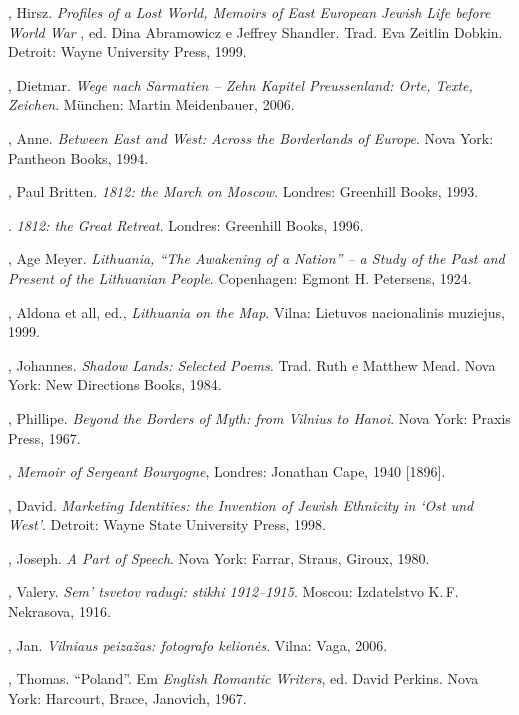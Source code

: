 \begin{bibliohedra}
 , Hirsz. \textit{Profiles of a Lost World, Memoirs of East
  European Jewish Life before World War }, ed. Dina Abramowicz e
  Jeffrey Shandler. Trad. Eva Zeitlin Dobkin. Detroit: Wayne University
  Press, 1999.

  , Dietmar. \textit{Wege nach Sarmatien -- Zehn Kapitel
  Preussenland: Orte, Texte, Zeichen}. München: Martin Meidenbauer,
  2006.

  , Anne. \textit{Between East and West: Across the Borderlands
  of Europe}. Nova York: Pantheon Books, 1994.

  , Paul Britten. \textit{1812: the March on Moscow}. Londres:
  Greenhill Books, 1993.

  \titidem. \textit{1812: the Great Retreat}. Londres:
  Greenhill Books, 1996.

  , Age Meyer. \textit{Lithuania, ``The Awakening of a Nation''
  -- a Study of the Past and Present of the Lithuanian People}.
  Copenhagen: Egmont H. Petersens, 1924.

  , Aldona et all, ed., \textit{Lithuania on the Map}. Vilna:
  Lietuvos nacionalinis muziejus, 1999.

  , Johannes. \textit{Shadow Lands: Selected Poems.} Trad. Ruth e
  Matthew Mead. Nova York: New Directions Books, 1984.

  , Phillipe. \textit{Beyond the Borders of Myth: from Vilnius to
  Hanoi}. Nova York: Praxis Press, 1967.

  , \textit{Memoir of Sergeant Bourgogne}, Londres: Jonathan Cape,
  1940 {[}1896{]}.

  , David. \textit{Marketing Identities: the Invention of Jewish
  Ethnicity in `Ost und West'}. Detroit: Wayne State University Press,
  1998.

  , Joseph. \textit{A Part of Speech}. Nova York: Farrar, Straus,
  Giroux, 1980.

  , Valery. \textit{Sem' tsvetov radugi: stikhi 1912--1915}. Moscou:
  Izdatelstvo K.\,F. Nekrasova, 1916.

  , Jan. \textit{Vilniaus peizažas: fotografo kelionės}. Vilna:
  Vaga, 2006.

  , Thomas. ``Poland''. Em \textit{English Romantic Writers}, ed.
  David Perkins. Nova York: Harcourt, Brace, Janovich, 1967.


\end{bibliohedra}
